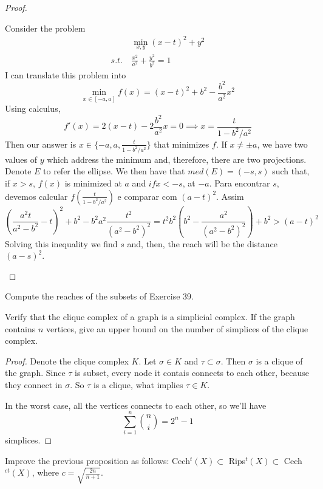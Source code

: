 \begin{proof}
\begin{enumerate}
    Consider the problem
    \begin{align*}
        &\min_{x,y} (x - t)^2 + y^2 \\
        s.t. ~& \frac{x^2}{a^2} + \frac{y^2}{b^2} = 1
    \end{align*}
    I can translate this problem into 
    $$
    \min_{x \in [-a,a]} f(x) = (x - t)^2 + b^2 - \frac{b^2}{a^2}x^2
    $$
    Using calculus, 
    $$
    f'(x) = 2(x - t) - 2\frac{b^2}{a^2}x = 0 \implies x = \frac{t}{1 - b^2/a^2}
    $$
    Then our answer is $x \in \{-a, a, \frac{t}{1 - b^2/a^2}\}$ that minimizes
    $f$. If $x \neq \pm a$, we have two values of $y$ which address the
    minimum and, therefore, there are two projections. Denote $E$ to refer the ellipse. We then have that $med(E) =
    (-s,s)$
    such that, if $x > s$, $f(x)$ is minimized at $a$ and $if x < -s$, at
    $-a$. Para encontrar $s$, devemos calcular $f(\frac{t}{1 - b^2/a^2})$ e
    comparar com $(a - t)^2$. Assim 
    $$
    \left(\frac{a^2t}{a^2 - b^2} - t\right)^2 + b^2 - b^2a^2\frac{t^2}{(a^2 - b^2)^2} = t^2b^2\left(b^2 - \frac{a^2}{(a^2 - b^2)^2}\right) + b^2 > (a - t)^2
    $$
    Solving this inequality we find $s$ and, then, the reach will be the
    distance $(a - s)^2$. 


\end{enumerate}

\end{proof}

\noindent\linia

\begin{exercise}
    Compute the reaches of the subsets of Exercise 39.
\end{exercise}

\noindent\linia

\begin{exercise}
    Verify that the clique complex of a graph is a simplicial complex. If the
    graph contains $n$ vertices, give an upper bound on the number of
    simplices of the clique complex.
\end{exercise}

\begin{proof}

Denote the clique complex $K$. Let $\sigma \in K$ and $\tau \subset \sigma$.
Then $\sigma$ is a clique of the graph. Since $\tau$ is subset, every node it
contais connects to each other, because they connect in $\sigma$. So $\tau$ is
a clique, what implies $\tau \in K$.

In the worst case, all the vertices connects to each other, so we'll have 
$$
\sum_{i=1}^n \genfrac(){0pt}{}{n}{i} = 2^n - 1
$$
simplices.

\end{proof}

\noindent\linia

\begin{exercise}
    Improve the previous proposition as follows: Cech$^t(X) \subset $
    Rips$^t(X) \subset $ Cech$^{ct}(X)$, where $c = \sqrt{\frac{2n}{n+1}}$.
\end{exercise}